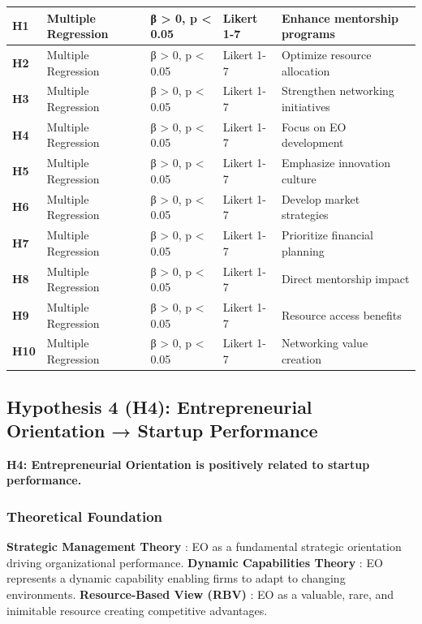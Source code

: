 \documentclass[../Main.tex]{subfiles}
\begin{document}
\begin{table}[H]
\begin{longtable}{|p{1.5cm}|p{3cm}|p{3cm}|p{3cm}|p{2.5cm}|}
            \textbf{H1} & Multiple Regression & β > 0, p < 0.05 & Likert 1-7 & Enhance mentorship programs \\
            \hline
            \textbf{H2} & Multiple Regression & β > 0, p < 0.05 & Likert 1-7 & Optimize resource allocation \\
            \hline
            \textbf{H3} & Multiple Regression & β > 0, p < 0.05 & Likert 1-7 & Strengthen networking initiatives \\
            \hline
            \textbf{H4} & Multiple Regression & β > 0, p < 0.05 & Likert 1-7 & Focus on EO development \\
            \hline
            \textbf{H5} & Multiple Regression & β > 0, p < 0.05 & Likert 1-7 & Emphasize innovation culture \\
            \hline
            \textbf{H6} & Multiple Regression & β > 0, p < 0.05 & Likert 1-7 & Develop market strategies \\
            \hline
            \textbf{H7} & Multiple Regression & β > 0, p < 0.05 & Likert 1-7 & Prioritize financial planning \\
            \hline
            \textbf{H8} & Multiple Regression & β > 0, p < 0.05 & Likert 1-7 & Direct mentorship impact \\
            \hline
            \textbf{H9} & Multiple Regression & β > 0, p < 0.05 & Likert 1-7 & Resource access benefits \\
            \hline
            \textbf{H10} & Multiple Regression & β > 0, p < 0.05 & Likert 1-7 & Networking value creation \\
            \hline
        \end{longtable}
    \end{table}

    \subsection{Hypothesis 4 (H4): Entrepreneurial Orientation → Startup Performance}
    \textbf{H4: Entrepreneurial Orientation is positively related to startup performance.}

    \subsubsection{Theoretical Foundation}
    \textbf{Strategic Management Theory} \cite{miller1983correlates, covin1989strategic}: EO as a fundamental strategic orientation driving organizational performance. 
    \textbf{Dynamic Capabilities Theory} \cite{teece1997dynamic}: EO represents a dynamic capability enabling firms to adapt to changing environments. 
    \textbf{Resource-Based View (RBV)} \cite{barney1991firm}: EO as a valuable, rare, and inimitable resource creating competitive advantages.
\end{document}
